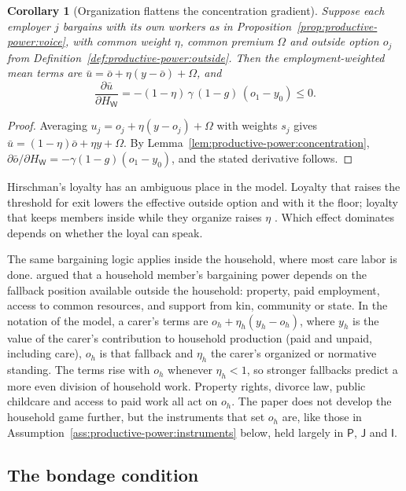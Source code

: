 \documentclass[11pt,letterpaper]{article}
\newtheorem{corollary}[theorem]{Corollary}
\theoremstyle{definition}
\theoremstyle{remark}
\newcommand{\pP}{\mathsf{P}}
\newcommand{\pJ}{\mathsf{J}}
\newcommand{\pI}{\mathsf{I}}
\newcommand{\pW}{\mathsf{W}}
\newcommand{\HW}{H_{\pW}}
\begin{document}
\begin{corollary}[Organization flattens the concentration gradient]
\label{cor:productive-power:gradient}
Suppose each employer $j$ bargains with its own workers as in Proposition~\ref{prop:productive-power:voice}, with common weight $\eta$, common premium $\Omega$ and outside option $o_j$ from Definition~\ref{def:productive-power:outside}. Then the employment-weighted mean terms are $\bar u=\bar o+\eta(y-\bar o)+\Omega$, and
\[
\frac{\partial\bar u}{\partial\HW}=-(1-\eta)\,\gamma\,(1-g)\,(o_1-y_0)\le 0 .
\]
\end{corollary}

\begin{proof}
Averaging $u_j=o_j+\eta(y-o_j)+\Omega$ with weights $s_j$ gives $\bar u=(1-\eta)\bar o+\eta y+\Omega$. By Lemma~\ref{lem:productive-power:concentration}, $\partial\bar o/\partial\HW=-\gamma(1-g)(o_1-y_0)$, and the stated derivative follows.
\end{proof}

Hirschman's loyalty has an ambiguous place in the model. Loyalty that raises the threshold for exit lowers the effective outside option and with it the floor; loyalty that keeps members inside while they organize raises $\eta$ \citep{hirschman1970}. Which effect dominates depends on whether the loyal can speak.

The same bargaining logic applies inside the household, where most care labor is done. \citet{agarwal1997} argued that a household member's bargaining power depends on the fallback position available outside the household: property, paid employment, access to common resources, and support from kin, community or state. In the notation of the model, a carer's terms are $o_h+\eta_h(y_h-o_h)$, where $y_h$ is the value of the carer's contribution to household production (paid and unpaid, including care), $o_h$ is that fallback and $\eta_h$ the carer's organized or normative standing. The terms rise with $o_h$ whenever $\eta_h<1$, so stronger fallbacks predict a more even division of household work. Property rights, divorce law, public childcare and access to paid work all act on $o_h$. The paper does not develop the household game further, but the instruments that set $o_h$ are, like those in Assumption~\ref{ass:productive-power:instruments} below, held largely in $\pP$, $\pJ$ and $\pI$.

\subsection{The bondage condition}
\end{document}
